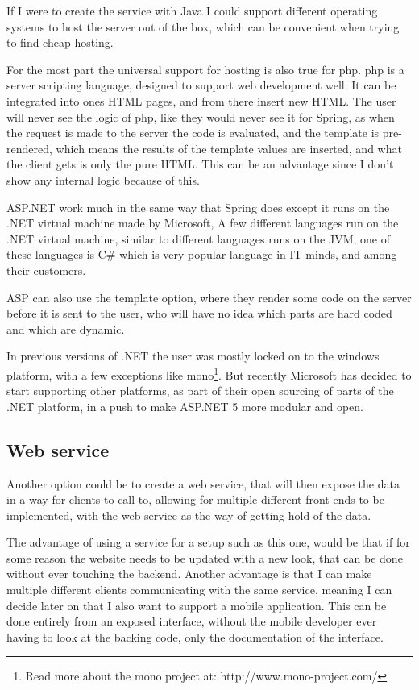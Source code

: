 If I were to create the service with Java I could support different operating systems to host the server out of the box, which can be convenient when trying to find cheap hosting.

For the most part the universal support for hosting is also true for php. php is
a server scripting language\cite{php-home}, designed to support web development
well. It can be integrated into ones HTML pages, and from there insert new HTML.
The user will never see the logic of php, like they would never see it for
Spring, as when the request is made to the server the code is evaluated, and the
template is pre-rendered, which means the results of the template values are
inserted, and what the client gets is only the pure HTML. This can be an
advantage since I don't show any internal logic because of this. 

ASP.NET work much in the same way that Spring does except it runs on the .NET
virtual machine made by Microsoft, A few different languages run on the .NET
virtual machine, similar to different languages runs on the JVM, one of these
languages is C\# which is very popular language in IT minds, and among their
customers. 

ASP can also use the template option, where they render some code on the server
before it is sent to the user, who will have no idea which parts are hard coded
and which are dynamic. 

In previous versions of .NET the user was mostly locked on to the windows
platform, with a few exceptions like mono\footnote{Read more about the mono
  project at: http://www.mono-project.com/}. But recently Microsoft has decided
to start supporting other platforms, as part of their open sourcing of parts of
the .NET platform\cite{.net-core}, in a push to make ASP.NET 5 more modular and
open. 

\subsection{Web service}
\label{sub:Web service}
Another option could be to create a web service, that will then expose the data
in a way for clients to call to, allowing for multiple different front-ends to be
implemented, with the web service as the way of getting hold of the data. 

The advantage of using a service for a setup such as this one, would be that if
for some reason the website needs to be updated with a new look, that can be
done without ever touching the backend. Another advantage is that I can make
multiple different clients communicating with the same service, meaning I can
decide later on that I also want to support a mobile application. This can be
done entirely from an exposed interface, without the mobile developer ever
having to look at the backing code, only the documentation of the interface. 

